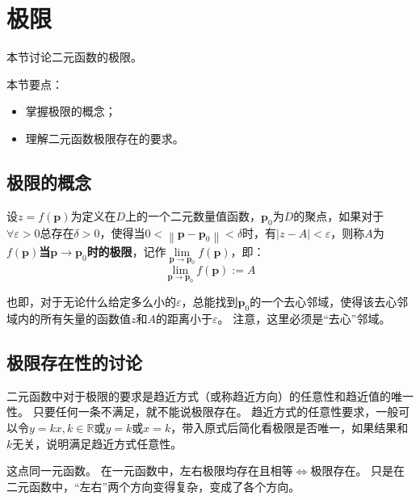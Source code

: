 \section{极限}

本节讨论二元函数的极限。

本节要点：
\begin{itemize}
    \item 掌握极限的概念；
    \item 理解二元函数极限存在的要求。
\end{itemize}

\subsection{极限的概念}

\begin{definition}[极限]
设$z=f\left( \boldsymbol{p} \right) $为定义在$D$上的一个二元数量值函数，$\boldsymbol{p}_0$为$D$的聚点，如果对于$\forall \varepsilon >0$总存在$\delta >0$，使得当$0<\left\| \boldsymbol{p}-\boldsymbol{p}_0 \right\| <\delta $时，有$\left| z-A \right|<\varepsilon $，则称$A$为{\bf $f\left( \boldsymbol{p} \right) $当$\boldsymbol{p}\rightarrow \boldsymbol{p}_0$时的极限}，记作$\underset{\boldsymbol{p}\rightarrow \boldsymbol{p}_0}{\lim}f\left( \boldsymbol{p} \right) $，即：
\[
\underset{\boldsymbol{p}\rightarrow \boldsymbol{p}_0}{\lim}f\left( \boldsymbol{p} \right) :=A
\]
\end{definition}

也即，对于无论什么给定多么小的$\varepsilon $，总能找到$\boldsymbol{p}_0$的一个去心邻域，使得该去心邻域内的所有矢量的函数值$z$和$A$的距离小于$\varepsilon $。
注意，这里必须是“去心”邻域。

\subsection{极限存在性的讨论}

二元函数中对于极限的要求是趋近方式（或称趋近方向）的任意性和趋近值的唯一性。
只要任何一条不满足，就不能说极限存在。
趋近方式的任意性要求，一般可以令$y=kx,k\in \mathbb{R} $或$y=k$或$x=k$，带入原式后简化看极限是否唯一，如果结果和$k$无关，说明满足趋近方式任意性。

这点同一元函数。
在一元函数中，左右极限均存在且相等$\Leftrightarrow $极限存在。
只是在二元函数中，“左右”两个方向变得复杂，变成了各个方向。

